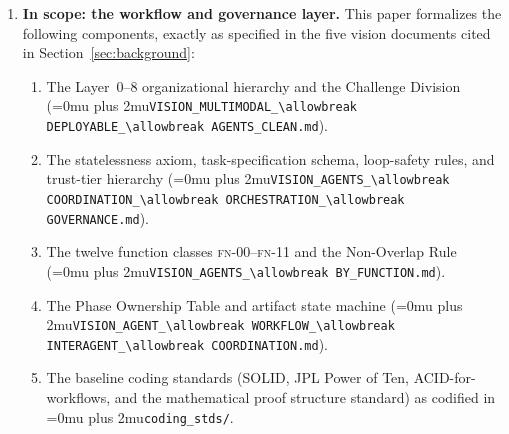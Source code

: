 \documentclass[12pt]{article}
\theoremstyle{definition}
\DeclareRobustCommand{\code}[1]{\begingroup\Urlmuskip=0mu plus 2mu\relax\nolinkurl{#1}\endgroup}
\newcommand{\FN}[1]{\textsc{fn-#1}}
\newcommand{\VisionClean}{\code{VISION\_MULTIMODAL\_\allowbreak DEPLOYABLE\_\allowbreak AGENTS\_CLEAN.md}}
\newcommand{\VisionGov}{\code{VISION\_AGENTS\_\allowbreak COORDINATION\_\allowbreak ORCHESTRATION\_\allowbreak GOVERNANCE.md}}
\newcommand{\VisionFunc}{\code{VISION\_AGENTS\_\allowbreak BY\_FUNCTION.md}}
\newcommand{\VisionFlow}{\code{VISION\_AGENT\_\allowbreak WORKFLOW\_\allowbreak INTERAGENT\_\allowbreak COORDINATION.md}}
\begin{document}
\begin{enumerate}

    \item \textbf{In scope: the workflow and governance layer.}
          This paper formalizes the following components, exactly as
          specified in the five vision documents cited in
          Section~\ref{sec:background}:
          \begin{enumerate}
              \item[S1.] The Layer~0--8 organizational hierarchy and
                         the Challenge Division (\VisionClean{}).
              \item[S2.] The statelessness axiom, task-specification
                         schema, loop-safety rules, and trust-tier
                         hierarchy (\VisionGov{}).
              \item[S3.] The twelve function classes \FN{00}--\FN{11}
                         and the Non-Overlap Rule (\VisionFunc{}).
              \item[S4.] The Phase Ownership Table and artifact state
                         machine (\VisionFlow{}).
              \item[S5.] The baseline coding standards (SOLID, JPL Power
                         of Ten, ACID-for-workflows, and the mathematical
                         proof structure standard) as codified in
                         \code{coding\_stds/}.
          \end{enumerate}


\end{enumerate}
\end{document}
